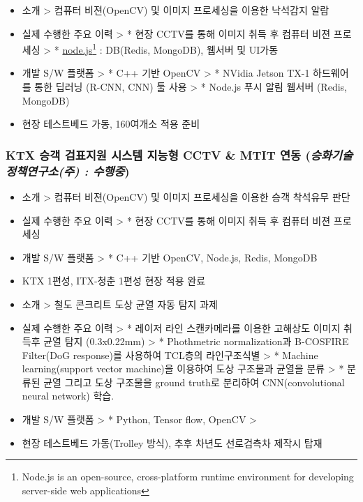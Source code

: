 \documentclass[]{article}
\begin{document}
\begin{itemize}
\item
  소개 \textgreater{} 컴퓨터 비젼(OpenCV) 및 이미지 프로세싱을 이용한 낙석감지 알람
\item
  실제 수행한 주요 이력 \textgreater{} * 현장 CCTV를 통해 이미지 취득 후 컴퓨터 비젼 프로세싱 \textgreater{} *
  \href{https://nodejs.org}{node.js}\footnote{Node.js is an open-source,
    cross-platform runtime environment for developing server-side web
    applications} : DB(Redis, MongoDB), 웹서버 및 UI가동
\item
  개발 S/W 플랫폼 \textgreater{} * C++ 기반 OpenCV \textgreater{} *
  NVidia Jetson TX-1 하드웨어를 통한 딥러닝 (R-CNN, CNN) 툴 사용 \textgreater{} *
  Node.js 푸시 알림 웹서버 (Redis, MongoDB)
\item 현장 테스트베드 가동, 160여개소 적용 준비
\end{itemize}

\subsubsection{KTX 승객 검표지원 시스템 지능형 CCTV \& MTIT 연동 (\emph{승화기술정책연구소(주) : \textbf{수행중}})}

\begin{itemize}
\item
  소개 \textgreater{} 컴퓨터 비젼(OpenCV) 및 이미지 프로세싱을 이용한 승객 착석유무 판단
\item
  실제 수행한 주요 이력 \textgreater{} * 현장 CCTV를 통해 이미지 취득 후 컴퓨터 비젼 프로세싱
\item
  개발 S/W 플랫폼 \textgreater{} * C++ 기반 OpenCV, Node.js, Redis, MongoDB
\item KTX 1편성, ITX-청춘 1편성 현장 적용 완료
\end{itemize}

\begin{itemize}
\item
  소개 \textgreater{} 철도 콘크리트 도상 균열 자동 탐지 과제
\item
  실제 수행한 주요 이력 \textgreater{} * 레이저 라인 스캔카메라를 이용한 고해상도 이미지 취득후 균열 탐지 (0.3x0.22mm) \textgreater{} * Phothmetric normalization과 B-COSFIRE Filter(DoG response)를 사용하여 TCL층의 라인구조식별
\textgreater{} * Machine learning(support vector machine)을 이용하여 도상 구조물과 균열을 분류
\textgreater{} * 분류된 균열 그리고 도상 구조물을 ground truth로 분리하여 CNN(convolutional neural network) 학습.
\item
  개발 S/W 플랫폼 \textgreater{} * Python, Tensor flow, OpenCV \textgreater{}
\item 현장 테스트베드 가동(Trolley 방식), 추후 차년도 선로검측차 제작시 탑재
\end{itemize}
\end{document}
